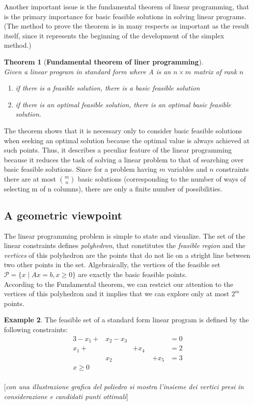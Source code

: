 \documentclass[a4paper,10 pt,titlepage,twoside]{book}
\theoremstyle{plain}
\newtheorem{thm}{Theorem}[chapter]
\theoremstyle{definition}
\newtheorem{ex}[thm]{Example}
\theoremstyle{remark}
\begin{document}
Another important issue is the fundamental theorem of linear programming, that is the primary importance for basic feasible solutions in solving linear programs.\\ (The method to prove the theorem is in many respects as important as the result itself, since it represents the beginning of the development of the simplex
method.)
\begin{thm}[\textbf{Fundamental theorem of liner programming}] \ \\
Given a linear program in standard form where A is an $n \times m$ matrix of rank $n$
\begin{enumerate}
\item if there is a feasible solution, there is a basic feasible solution
\item if there is an optimal feasible solution, there is an optimal basic feasible solution.
\end{enumerate}
\end{thm}
The theorem shows that it is necessary only to consider basic feasible solutions when seeking an optimal solution because the optimal value is always achieved at such points.
Thus, it describes a peculiar feature of the linear programming because it reduces the task of solving a linear problem to that of searching over basic feasible solutions. Since for a problem having $m$ variables and $n$ constraints there are at most ${m}\choose{n}$ basic solutions (corresponding to the number of ways of selecting m of n columns), there are only a finite number of possibilities. 

\subsection{A geometric viewpoint}
The linear programming problem is simple to state and visualize. The set of the linear constraints defines  \textit{polyhedron}, that constitutes the \textit{feasible region} and the \textit{vertices} of this polyhedron are the points that do not lie on a stright line between two other points in the set. Algebraically, the vertices of the feasible set $\mathcal{P}=\lbrace x\; |\; Ax = b , x \geq0\rbrace$ are exactly the basic feasible points.\\ According to the Fundamental theorem, we can restrict our attention to the vertices of this polyhedron and it implies that we can explore only at most $2^{m}$ points. 
\begin{ex}
The feasible set of a standard form linear program is defined by the following constraints:
\begin{alignat*}{3}
-x_{1}+&x_{2}-x_{3}&\;&\;&= 0\\
 x_{1}+&\;&+x_{4}\;&\;&= 2\\
 &x_{2}&\;&+x_{5}&= 3\\
x \geq 0&\;&\;&\;&\\
\end{alignat*}
\end{ex}
 [\textit{con una illustrazione grafica del poliedro si mostra l'insieme dei vertici presi in considerazione e candidati punti ottimali}]
\end{document}
